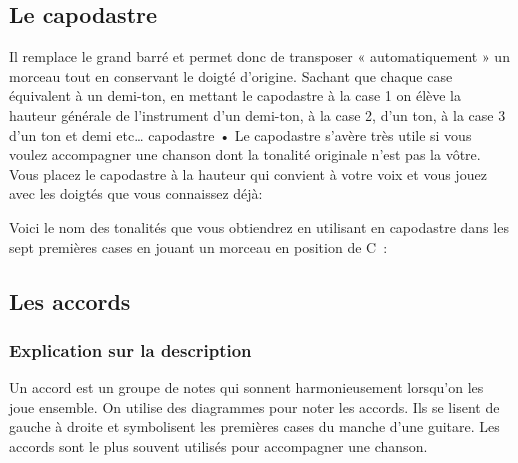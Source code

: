\subsection{Le capodastre}
Il remplace le grand barré et permet donc de transposer « automatiquement » un morceau tout en conservant le doigté d'origine. Sachant que chaque case équivalent à un demi-ton, en mettant le capodastre à la case 1 on élève la hauteur générale de l'instrument d'un demi-ton, à la case 2, d'un ton, à la case 3 d'un ton et demi etc… capodastre • Le capodastre s'avère très utile si vous voulez accompagner une chanson dont la tonalité originale n'est pas la vôtre. Vous placez le capodastre à la hauteur qui convient à votre voix et vous jouez avec les doigtés que vous connaissez déjà:


Voici le nom des tonalités que vous obtiendrez en utilisant en capodastre dans les sept premières cases en jouant un morceau en position de C~:~


\newpage
\subsection{Les accords}

\subsubsection{Explication sur la description}

Un accord est un groupe de notes qui sonnent harmonieusement lorsqu'on les joue ensemble. On utilise des diagrammes pour noter les accords. Ils se lisent de gauche à droite et symbolisent les premières cases du manche d'une guitare. Les accords sont le plus souvent utilisés pour accompagner une chanson.


